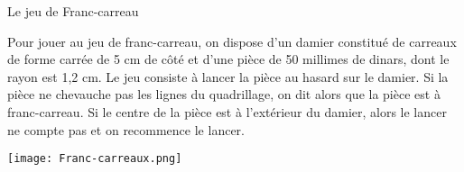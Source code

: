 
\begin{minipage}{0.68\linewidth}
Le jeu de Franc-carreau

Pour jouer au jeu de franc-carreau, on dispose d’un damier constitué de carreaux de forme carrée de 5 cm de côté et d’une pièce de 50 millimes de dinars, dont le rayon est 1,2 cm. Le jeu consiste à lancer la pièce au hasard sur le damier. 
Si la pièce ne chevauche pas les lignes du quadrillage, on dit alors que la pièce est à franc-carreau. 
Si le centre de la pièce est à l’extérieur du damier, alors le lancer ne compte pas et on recommence le lancer.
\end{minipage}
\hfill
\begin{minipage}{0.28\linewidth}
\texttt{[image: Franc-carreaux.png]} 
\end{minipage}

